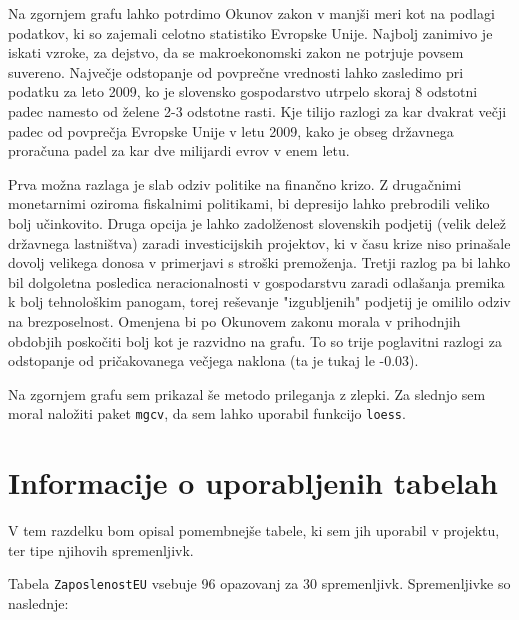 \documentclass[11pt,a4paper]{article}
\begin{document}
Na zgornjem grafu lahko potrdimo Okunov zakon v manjši meri kot na podlagi podatkov, ki so zajemali celotno statistiko Evropske Unije. Najbolj zanimivo je iskati vzroke, za dejstvo, da se makroekonomski zakon ne potrjuje povsem suvereno. Največje odstopanje od povprečne vrednosti lahko zasledimo pri podatku za leto 2009, ko je slovensko gospodarstvo utrpelo skoraj 8 odstotni padec namesto od želene 2-3 odstotne rasti. Kje tilijo razlogi za kar dvakrat večji padec od povprečja Evropske Unije v letu 2009, kako je obseg državnega proračuna padel za kar dve milijardi evrov v enem letu.

Prva možna razlaga je slab odziv politike na finančno krizo. Z drugačnimi monetarnimi oziroma fiskalnimi politikami, bi depresijo lahko prebrodili veliko bolj učinkovito. Druga opcija je lahko zadolženost slovenskih podjetij (velik delež državnega lastništva) zaradi investicijskih projektov, ki v času krize niso prinašale dovolj velikega donosa v primerjavi s stroški premoženja. Tretji razlog pa bi lahko bil dolgoletna posledica neracionalnosti v gospodarstvu zaradi odlašanja premika k bolj tehnološkim panogam, torej reševanje "izgubljenih" podjetij je omililo odziv na brezposelnost. Omenjena bi po Okunovem zakonu morala v prihodnjih obdobjih poskočiti bolj kot je razvidno na grafu. To so trije poglavitni razlogi za odstopanje od pričakovanega večjega naklona (ta je tukaj le -0.03).


Na zgornjem grafu sem prikazal še metodo prileganja z zlepki. Za slednjo sem moral naložiti paket \verb|mgcv|, da sem lahko uporabil funkcijo \verb|loess|.


\pagebreak
\section{Informacije o uporabljenih tabelah}

V tem razdelku bom opisal pomembnejše tabele, ki sem jih uporabil v projektu, ter tipe njihovih spremenljivk.

Tabela \verb|ZaposlenostEU| vsebuje 96 opazovanj za 30 spremenljivk. Spremenljivke so naslednje:
\end{document}
